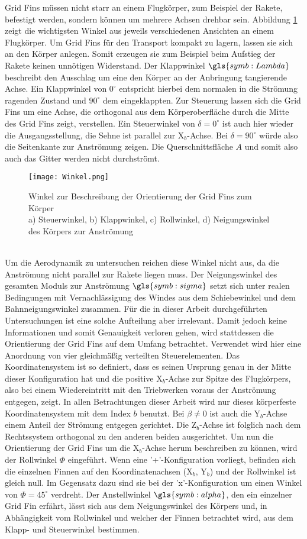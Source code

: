 Grid Fins müssen nicht starr an einem Flugkörper, zum Beispiel der Rakete, befestigt werden, sondern können um mehrere Achsen drehbar sein. Abbildung \ref{abb_winkel} zeigt die wichtigsten Winkel aus jeweils verschiedenen Ansichten an einem Flugkörper. Um Grid Fins für den Transport kompakt zu lagern, lassen sie sich an den Körper anlegen. Somit erzeugen sie zum Beispiel beim Aufstieg der Rakete keinen unnötigen Widerstand. Der Klappwinkel $\gls{symb:Lambda}$ beschreibt den Ausschlag um eine den Körper an der Anbringung tangierende Achse. Ein Klappwinkel von $0^\circ$ entspricht hierbei dem normalen in die Strömung ragenden Zustand und $90^\circ$ dem eingeklappten. Zur Steuerung lassen sich die Grid Fins um eine Achse, die orthogonal aus dem Körperoberfläche durch die Mitte des Grid Fins zeigt, verstellen. Ein Steuerwinkel von $\delta = 0^\circ$ ist auch hier wieder die Ausgangsstellung, die Sehne ist parallel zur X$_b$-Achse. Bei $\delta = 90^\circ$ würde also die Seitenkante zur Anströmung zeigen. Die Querschnittsfläche $A$ und somit also auch das Gitter werden nicht durchströmt.
\begin{figure}[h]
	\centering
	\texttt{[image: Winkel.png]}
	\caption{Winkel zur Beschreibung der Orientierung der Grid Fins zum Körper\\a) Steuerwinkel, b) Klappwinkel, c) Rollwinkel, d) Neigungswinkel des Körpers zur Anströmung}
	\label{abb_winkel}
\end{figure}\\
Um die Aerodynamik zu untersuchen reichen diese Winkel nicht aus, da die Anströmung nicht parallel zur Rakete liegen muss. Der Neigungswinkel des gesamten Moduls zur Anströmung $\gls{symb:sigma}$ setzt sich unter realen Bedingungen mit Vernachlässigung des Windes aus dem Schiebewinkel und dem Bahnneigungswinkel zusammen. Für die in dieser Arbeit durchgeführten Untersuchungen ist eine solche Aufteilung aber irrelevant. Damit jedoch keine Informationen und somit Genauigkeit verloren gehen, wird stattdessen die Orientierung der Grid Fins auf dem Umfang betrachtet. Verwendet wird hier eine Anordnung von vier gleichmäßig verteilten Steuerelementen. Das Koordinatensystem ist so definiert, dass es seinen Ursprung genau in der Mitte dieser Konfiguration hat und die positive X$_b$-Achse zur Spitze des Flugkörpers, also bei einem Wiedereintritt mit den Triebwerken voraus der Anströmung entgegen, zeigt. In allen Betrachtungen dieser Arbeit wird nur dieses körperfeste Koordinatensystem mit dem Index $b$ benutzt. Bei $\beta \neq 0$ ist auch die Y$_b$-Achse einem Anteil der Strömung entgegen gerichtet. Die Z$_b$-Achse ist folglich nach dem Rechtssystem orthogonal zu den anderen beiden ausgerichtet. Um nun die Orientierung der Grid Fins um die X$_b$-Achse herum beschreiben zu können, wird der Rollwinkel $\Phi$ eingeführt. Wenn eine '+'-Konfiguration vorliegt, befinden sich die einzelnen Finnen auf den Koordinatenachsen (X$_b$, Y$_b$) und der Rollwinkel ist gleich null. Im Gegensatz dazu sind sie bei der 'x'-Konfiguration um einen Winkel von $\Phi = 45^\circ$ verdreht. Der Anstellwinkel $\gls{symb:alpha}$, den ein einzelner Grid Fin erfährt, lässt sich aus dem Neigungswinkel des Körpers und, in Abhängigkeit vom Rollwinkel und welcher der Finnen betrachtet wird, aus dem Klapp- und Steuerwinkel bestimmen.
